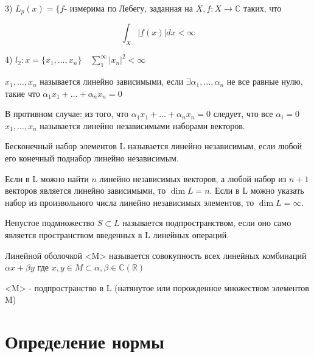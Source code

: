 \documentclass[12pt, a4paper]{report}
\begin{document}
3) \(\displaystyle  L_p (x)= \{f \text{- измерима по Лебегу, заданная на } X , f: X \to  \mathbb{C} \text{ таких, что }   \)

\[  \int_{X}|f(x)|dx< \infty  \] 

4) \(\displaystyle  l_2 : x = \{x_1 , \ldots , x_n  \} \quad \sum ^{\infty }_{1}  |x_n| ^2 < \infty  \) 

\begin{definition}
    \( x_1, \ldots, x_n \)  называется линейно зависимыми, если \( \exists \alpha_1 , \ldots , \alpha _ n   \) не все равные нулю, такие что \( \alpha_1 x_1 + \dots + \alpha_n x_n=0   \)
    
    В противном случае: из того, что \( \alpha_1 x_1 + \dots + \alpha_n x_n=0 \) следует, что все \( \alpha_i =0  \) \( x_1, \ldots, x_n \)  называется линейно независимыми наборами  векторов.  
\end{definition}

\begin{definition}
    Бесконечный набор элементов L называется линейно независимым, если любой его конечный поднабор линейно независимым.
\end{definition}

\begin{definition}
    Если в L можно найти \( n  \)  линейно независимых векторов, а любой набор из \( n+1 \) векторов является линейно зависимыми, то \( \dim L= n \). Если в L можно указать   набор из произвольного числа линейно независимых элементов, то \( \dim L= \infty  \). 
\end{definition}

\begin{definition}
    Непустое подмножество \( S \subset L  \)  называется подпространством, если оно само является пространством введенных в L линейных операций.
\end{definition}

\begin{definition}
    Линейной  оболочкой  <M> называется совокупность всех линейных комбинаций  \( \alpha x + \beta y  \)  где \(  x,y \in  M  \subset \alpha, \beta \in  \mathbb{C}(\mathbb{R}) \) 

    <M> - подпространство в L  (натянутое или порожденное множеством элементов M)
\end{definition}

\section{Определение нормы} 
\end{document}
